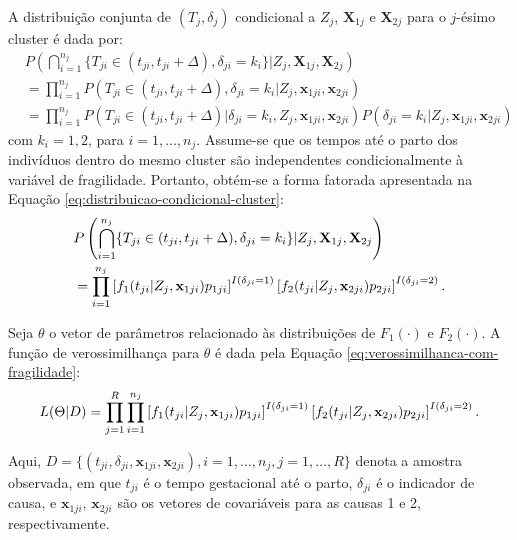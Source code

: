 A distribuição conjunta de $(T_j,\delta_j)$ condicional a $Z_j$, $\mathbf{X}_{1j}$ e
$\mathbf{X}_{2j}$ para o $j$-ésimo cluster é dada por:
\[
\begin{aligned}
&P\left(
\bigcap_{i=1}^{n_j}\{T_{ji}\in(t_{ji},t_{ji}+\Delta),\delta_{ji}=k_i\}
| Z_j,\mathbf{X}_{1j},\mathbf{X}_{2j}
\right)\\
&=\prod_{i=1}^{n_j}
P(T_{ji}\in(t_{ji},t_{ji}+\Delta),\delta_{ji}=k_i
| Z_j,\mathbf{x}_{1ji},\mathbf{x}_{2ji})\\
&=\prod_{i=1}^{n_j}
P(T_{ji}\in(t_{ji},t_{ji}+\Delta)|
\delta_{ji}=k_i,Z_j,\mathbf{x}_{1ji},\mathbf{x}_{2ji})
P(\delta_{ji}=k_i| Z_j,\mathbf{x}_{1ji},\mathbf{x}_{2ji})
\end{aligned}
\]
com $k_i=1,2$, para $i=1,\ldots,n_j$. Assume-se que os tempos até o parto dos
indivíduos dentro do mesmo cluster são independentes condicionalmente à variável
de fragilidade. Portanto, obtém-se a forma fatorada apresentada na Equação \ref{eq:distribuicao-condicional-cluster}:
\begin{equation}
\lequation{Distribuição conjunta condicional no cluster}
\label{eq:distribuicao-condicional-cluster}
\begin{aligned}
&P\left(
\bigcap_{i=1}^{n_j}\{T_{ji}\in(t_{ji},t_{ji}+\Delta),\delta_{ji}=k_i\}
| Z_j,\mathbf{X}_{1j},\mathbf{X}_{2j}
\right)\\
&=
 \prod_{i=1}^{n_j}
 \left[f_1(t_{ji}| Z_j,\mathbf{x}_{1ji})p_{1ji}\right]^{I(\delta_{ji}=1)}
 \left[f_2(t_{ji}| Z_j,\mathbf{x}_{2ji})p_{2ji}\right]^{I(\delta_{ji}=2)}.
\end{aligned}
\end{equation}

Seja $\theta$ o vetor de parâmetros relacionado às distribuições de $F_1(\cdot)$
e $F_2(\cdot)$. A função de verossimilhança para $\theta$ é dada pela Equação \ref{eq:verossimilhanca-com-fragilidade}:
\begin{equation}
\lequation{Verossimilhança com fragilidade compartilhada}
\label{eq:verossimilhanca-com-fragilidade}
L(\Theta| D)=
\prod_{j=1}^{R}\prod_{i=1}^{n_j}
\left[f_1(t_{ji}| Z_j,\mathbf{x}_{1ji})p_{1ji}\right]^{I(\delta_{ji}=1)}
\left[f_2(t_{ji}| Z_j,\mathbf{x}_{2ji})p_{2ji}\right]^{I(\delta_{ji}=2)}.
\end{equation}

Aqui,
$D=\{(t_{ji},\delta_{ji},\mathbf{x}_{1ji},\mathbf{x}_{2ji}),i=1,\ldots,n_j,j=1,\ldots,R\}$
denota a amostra observada, em que $t_{ji}$ é o tempo gestacional até o parto,
$\delta_{ji}$ é o indicador de causa, e $\mathbf{x}_{1ji}$, $\mathbf{x}_{2ji}$ são os vetores de
covariáveis para as causas 1 e 2, respectivamente.

